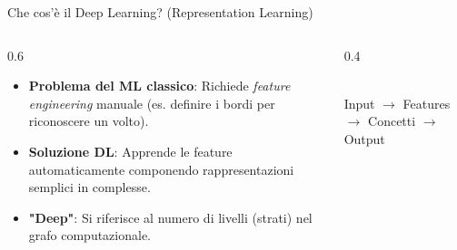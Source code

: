 \documentclass[aspectratio=169, 10pt]{beamer}
\begin{document}
\begin{frame}{Che cos'è il Deep Learning? (Representation Learning)}
    \begin{columns}[T]
        \begin{column}{0.6\textwidth}
            \begin{itemize}
                \item \textbf{Problema del ML classico}: Richiede \emph{feature engineering} manuale (es. definire i bordi per riconoscere un volto).
                \item \textbf{Soluzione DL}: Apprende le feature automaticamente componendo rappresentazioni semplici in complesse.
                \item \textbf{"Deep"}: Si riferisce al numero di livelli (strati) nel grafo computazionale.
            \end{itemize}
        \end{column}
        \begin{column}{0.4\textwidth}
            \centering
            \scriptsize\\Input $\to$ Features $\to$ Concetti $\to$ Output
        \end{column}
    \end{columns}
\end{frame}
\end{document}
